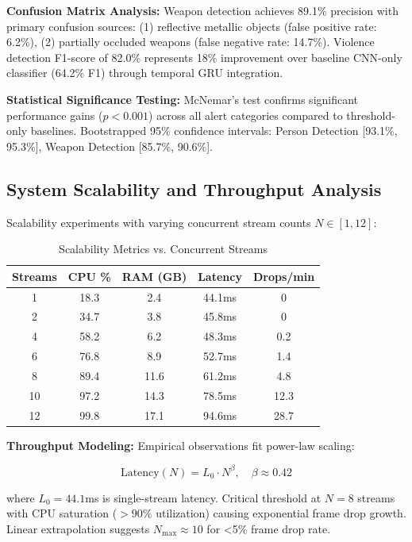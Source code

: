 \documentclass[conference]{IEEEtran}
\begin{document}
\textbf{Confusion Matrix Analysis:}
Weapon detection achieves 89.1\% precision with primary confusion sources: (1) reflective metallic objects (false positive rate: 6.2\%), (2) partially occluded weapons (false negative rate: 14.7\%). Violence detection F1-score of 82.0\% represents 18\% improvement over baseline CNN-only classifier (64.2\% F1) through temporal GRU integration.

\textbf{Statistical Significance Testing:}
McNemar's test confirms significant performance gains ($p < 0.001$) across all alert categories compared to threshold-only baselines. Bootstrapped 95\% confidence intervals: Person Detection [93.1\%, 95.3\%], Weapon Detection [85.7\%, 90.6\%].

\subsection{System Scalability and Throughput Analysis}
Scalability experiments with varying concurrent stream counts $N \in [1, 12]$:

\begin{table}[htbp]
\caption{Scalability Metrics vs. Concurrent Streams}
\begin{center}
\begin{tabular}{|c|c|c|c|c|}
\hline
\textbf{Streams} & \textbf{CPU \%} & \textbf{RAM (GB)} & \textbf{Latency} & \textbf{Drops/min} \\
\hline
1 & 18.3 & 2.4 & 44.1ms & 0 \\
\hline
2 & 34.7 & 3.8 & 45.8ms & 0 \\
\hline
4 & 58.2 & 6.2 & 48.3ms & 0.2 \\
\hline
6 & 76.8 & 8.9 & 52.7ms & 1.4 \\
\hline
8 & 89.4 & 11.6 & 61.2ms & 4.8 \\
\hline
10 & 97.2 & 14.3 & 78.5ms & 12.3 \\
\hline
12 & 99.8 & 17.1 & 94.6ms & 28.7 \\
\hline
\end{tabular}
\label{tab:scalability}
\end{center}
\end{table}

\textbf{Throughput Modeling:}
Empirical observations fit power-law scaling:

\begin{equation}
\text{Latency}(N) = L_0 \cdot N^{\beta}, \quad \beta \approx 0.42
\end{equation}

where $L_0 = 44.1$ms is single-stream latency. Critical threshold at $N=8$ streams with CPU saturation ($>90\%$ utilization) causing exponential frame drop growth. Linear extrapolation suggests $N_{\text{max}} \approx 10$ for <5\% frame drop rate.
\end{document}
